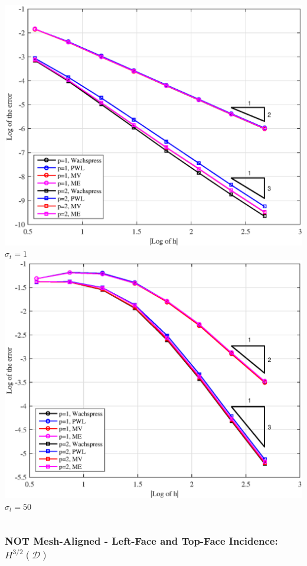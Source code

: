 \documentclass[compress,10pt]{beamer}
\begin{document}
\begin{frame}[t]
{\begin{columns}[c]
{}\includegraphics[width=\textwidth]{images/PAErr_LeftTop_SplitPoly_sig1.eps} \\
$\sigma_t = 1$
\centering
{}\includegraphics[width=\textwidth]{images/PAErr_LeftTop_SplitPoly_sig50.eps} \\
$\sigma_t = 50$
\end{columns}
}
{
\frametitle{NOT Mesh-Aligned -  Left-Face and Top-Face Incidence: $H^{3/2} (\mathcal{D})$}
\vspace{1.00cm}
\begin{columns}[c]
\centering

\end{columns}}
\end{frame}
\end{document}
